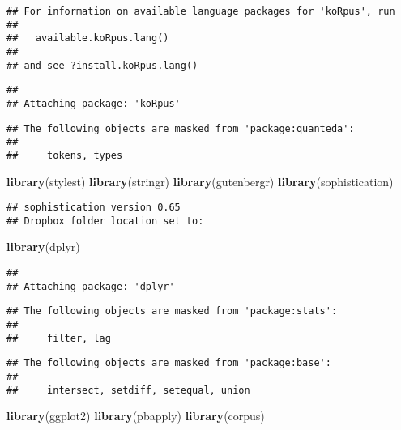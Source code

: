 \documentclass[]{article}
\newenvironment{Shaded}{\begin{snugshade}}{\end{snugshade}}
\newcommand{\KeywordTok}[1]{\textcolor[rgb]{0.13,0.29,0.53}{\textbf{#1}}}
\newcommand{\NormalTok}[1]{#1}
\begin{document}
\begin{verbatim}
## For information on available language packages for 'koRpus', run
## 
##   available.koRpus.lang()
## 
## and see ?install.koRpus.lang()
\end{verbatim}

\begin{verbatim}
## 
## Attaching package: 'koRpus'
\end{verbatim}

\begin{verbatim}
## The following objects are masked from 'package:quanteda':
## 
##     tokens, types
\end{verbatim}

\begin{Shaded}
\begin{Highlighting}[]
\KeywordTok{library}\NormalTok{(stylest)}
\KeywordTok{library}\NormalTok{(stringr)}
\KeywordTok{library}\NormalTok{(gutenbergr)}
\KeywordTok{library}\NormalTok{(sophistication)}
\end{Highlighting}
\end{Shaded}

\begin{verbatim}
## sophistication version 0.65
## Dropbox folder location set to:
\end{verbatim}

\begin{Shaded}
\begin{Highlighting}[]
\KeywordTok{library}\NormalTok{(dplyr)}
\end{Highlighting}
\end{Shaded}

\begin{verbatim}
## 
## Attaching package: 'dplyr'
\end{verbatim}

\begin{verbatim}
## The following objects are masked from 'package:stats':
## 
##     filter, lag
\end{verbatim}

\begin{verbatim}
## The following objects are masked from 'package:base':
## 
##     intersect, setdiff, setequal, union
\end{verbatim}

\begin{Shaded}
\begin{Highlighting}[]
\KeywordTok{library}\NormalTok{(ggplot2)}
\KeywordTok{library}\NormalTok{(pbapply)}
\KeywordTok{library}\NormalTok{(corpus)}
\end{Highlighting}
\end{Shaded}
\end{document}
